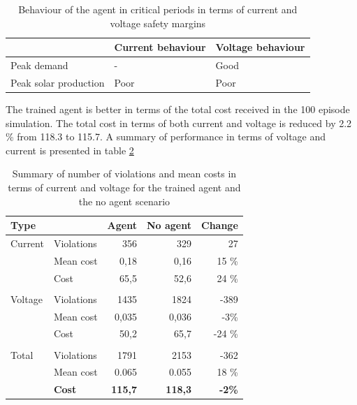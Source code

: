 \documentclass[class=book, crop=false]{standalone}
\begin{document}
\begin{table}[ht]
\center
\begin{tabular}{l|ll}
                      & Current behaviour     & Voltage behaviour \\
\hline
Peak demand           & - & Good              \\
Peak solar production & Poor                  & Poor \\
\hline
\end{tabular}
\caption{Behaviour of the agent in critical periods in terms of current and voltage safety margins}
\label{table:results:config1_behaviour}
\end{table}
The trained agent is better in terms of the total cost received in the 100 episode simulation. The total cost in terms of both current and voltage is reduced by 2.2 \% from 118.3 to 115.7. A summary of performance in terms of voltage and current is presented in table \ref{table:results:config1_summary}


\begin{table}[ht]
\center
\begin{tabular}{l|lrrr}
Type      &               & Agent          & No agent       & Change        \\
\hline
Current   & Violations    & 356            & 329            & 27            \\
          & Mean cost     & 0,18           & 0,16           & 15 \%         \\
          & Cost          & 65,5           & 52,6           & 24 \%         \\
          &               &                &                &               \\
Voltage   & Violations    & 1435           & 1824           & -389          \\
          & Mean  cost    & 0,035          & 0,036          & -3\%          \\
          & Cost          & 50,2           & 65,7           & -24 \%        \\
          &               &                &                &               \\
Total     & Violations    & 1791           & 2153           & -362          \\
          & Mean cost     & 0.065          & 0.055          & 18 \%         \\
\textbf{} & \textbf{Cost} & \textbf{115,7} & \textbf{118,3} & \textbf{-2\%} \\
\hline
\end{tabular}
\caption{Summary of number of violations and mean costs in terms of current and voltage for the trained agent and the no agent scenario}
\label{table:results:config1_summary}
\end{table}
\end{document}
